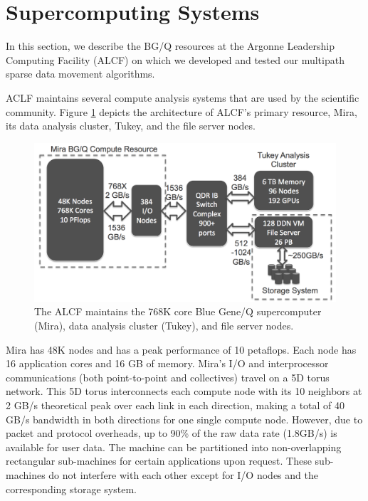 \section{Supercomputing Systems}
\label{sec:systems}

In this section, we describe the BG/Q resources at the Argonne Leadership Computing Facility (ALCF) on which we developed and tested our multipath sparse data movement algorithms.

ACLF maintains several compute analysis systems that are used by the scientific community. Figure \ref{fig:alcf} depicts the architecture of ALCF’s primary resource, Mira, its data analysis cluster, Tukey, and the file server nodes.

\begin{figure}[!htb]
\vspace{-0.1in}
\centering
\includegraphics[scale=0.2]{figures/anl_facility}
\vspace{-0.1in}
\caption{The ALCF maintains the 768K core Blue Gene/Q supercomputer (Mira), data analysis cluster (Tukey), and file server nodes.}
\vspace{-0.1in}
\label{fig:alcf}
\end{figure}

Mira has 48K nodes and has a peak performance of 10 petaflops. Each node has 16 application cores and 16 GB of memory.
Mira’s I/O and interprocessor communications (both point-to-point and collectives) travel on a 5D torus network. This 5D torus interconnects each compute node with its 10 neighbors at 2 GB/s theoretical peak over each link in each direction, making a total of 40 GB/s bandwidth in both directions for one single compute node. However, due to packet and protocol overheads, up to 90\% of the raw data rate (1.8GB/s) is available for user data. The machine can be partitioned into non-overlapping rectangular sub-machines for certain applications upon request. These sub-machines do not interfere with each other except for I/O nodes and the corresponding storage system.

